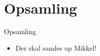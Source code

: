 \section{Opsamling}
{\aauwavesbg%
	\begin{frame}{Opsamling} %
\begin{itemize}
	\item Der skal samles op Mikkel!
\end{itemize}

\end{frame}}
